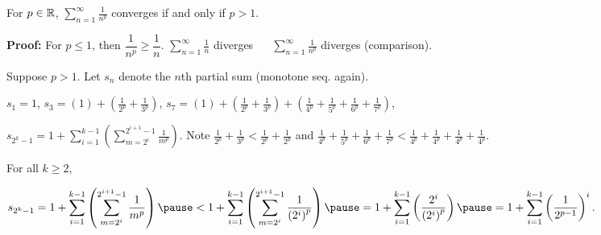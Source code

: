 \documentclass[10pt,aspectratio=169]{beamer}
\begin{document}
\begin{frame}

\begin{proposition}
For $p \in {\mathbb{R}}$, 
\quad
$\displaystyle
\sum_{n=1}^\infty \frac{1}{n^p}$
\quad
converges if and only if $p > 1$.
\end{proposition}

\pause
\textbf{Proof:}
For $p \leq 1$, then
$\dfrac{1}{n^p} \geq \dfrac{1}{n}$. \quad
$\displaystyle\sum_{n=1}^\infty \frac{1}{n}$ diverges ~\thus~
$\displaystyle\sum_{n=1}^\infty \frac{1}{n^p}$ diverges (comparison).

\pause
\medskip

Suppose $p > 1$.  Let $s_n$ denote the $n$th partial sum (monotone seq.
again).

\pause
\medskip

$s_1 = 1$,
\pause
\quad
$s_3 = \left( 1 \right) + \left( \frac{1}{2^p} + \frac{1}{3^p} \right)$,
\pause
\quad
$s_7 = \left( 1 \right) + \left( \frac{1}{2^p} + \frac{1}{3^p} \right) +
        \left( \frac{1}{4^p} + \frac{1}{5^p} + \frac{1}{6^p} + \frac{1}{7^p}
\right)$,

\pause
$\displaystyle
 s_{2^k - 1} = 
1 + 
\sum_{i=1}^{k-1}
\left(
\sum_{m=2^i}^{2^{i+1}-1} \frac{1}{m^p}
\right)$.
%
\pause
\quad
%
Note %
$\frac{1}{2^p} + \frac{1}{3^p} <
\frac{1}{2^p} + \frac{1}{2^p}$
\pause
and
$\frac{1}{4^p} + \frac{1}{5^p} +
\frac{1}{6^p} + \frac{1}{7^p} <
\frac{1}{4^p} + \frac{1}{4^p} +
\frac{1}{4^p} + \frac{1}{4^p}$.

\pause
\medskip

For all $k \geq 2$, 

$\displaystyle
s_{2^k-1}
=
1+
\sum_{i=1}^{k-1}
\left(
\sum_{m=2^{i}}^{2^{i+1}-1} \frac{1}{m^p}
\right) 
\pause
<
1+
\sum_{i=1}^{k-1}
\left(
\sum_{m=2^{i}}^{2^{i+1}-1} \frac{1}{{(2^i)}^p}
\right) 
%
\pause
%
=
1+
\sum_{i=1}^{k-1}
\left(
\frac{2^i}{{(2^i)}^p}
\right) 
\pause
=
1+
\sum_{i=1}^{k-1}
{\left(
\frac{1}{2^{p-1}}
\right)}^i$.

\end{frame}
\end{document}
